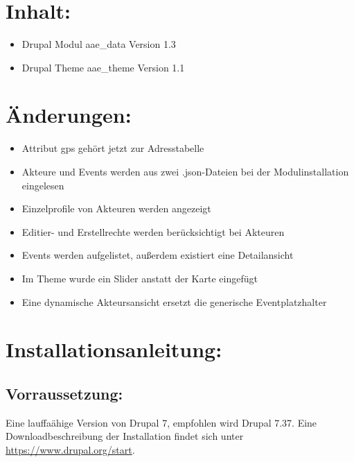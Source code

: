 \documentclass{swp}
\begin{document}
\\\\\\\\\\

\section{Inhalt:}
\begin{itemize} 
\item Drupal Modul \glqq aae\_{}data\grqq{} Version 1.3
\item Drupal Theme \glqq aae\_{}theme\grqq{} Version 1.1
\end{itemize}
\section{\"Anderungen:}
\begin{itemize} 
\item Attribut \glqq gps\grqq{} geh\"ort jetzt zur Adresstabelle
\item Akteure und Events werden aus zwei .json-Dateien bei der Modulinstallation eingelesen
\item Einzelprofile von Akteuren werden angezeigt
\item Editier- und Erstellrechte werden ber\"ucksichtigt bei Akteuren
\item Events werden aufgelistet, au{\ss}erdem existiert eine Detailansicht\\
\item Im Theme wurde ein Slider anstatt der Karte eingef\"ugt
\item Eine dynamische Akteursansicht ersetzt die generische Eventplatzhalter
\end{itemize}
\section{Installationsanleitung:}
\subsection{Vorraussetzung:}
Eine lauffa\"ahige Version von Drupal 7, empfohlen wird Drupal 7.37. Eine Downloadbeschreibung der Installation findet sich unter \url{https://www.drupal.org/start}.
\end{document}
